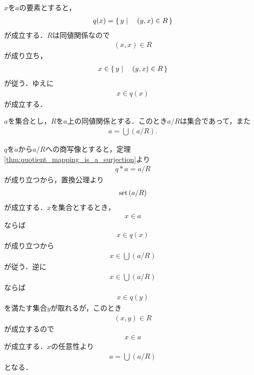 	\begin{sketch}
		$x$を$a$の要素とすると，
		\begin{align}
			q(x) = \left\{\, y \mid \quad (y,x) \in R\, \right\}
		\end{align}
		が成立する．$R$は同値関係なので
		\begin{align}
			(x,x) \in R
		\end{align}
		が成り立ち，
		\begin{align}
			x \in \left\{\, y \mid \quad (y,x) \in R\, \right\}
		\end{align}
		が従う．ゆえに
		\begin{align}
			x \in q(x)
		\end{align}
		が成立する．
		\QED
	\end{sketch}
	
	\begin{screen}
		\begin{thm}[商集合の合併は割る前の集合に一致する]
			$a$を集合とし，$R$を$a$上の同値関係とする．このとき$a/R$は集合であって，また
			\begin{align}
				a = \bigcup (a/R).
			\end{align}
		\end{thm}
	\end{screen}
	
	\begin{prf}
		$q$を$a$から$a/R$への商写像とすると，定理\ref{thm:quotient_mapping_is_a_surjection}より
		\begin{align}
			q \ast a = a/R
		\end{align}
		が成り立つから，置換公理より
		\begin{align}
			\operatorname*{set} \left(a/R\right)
		\end{align}
		が成立する．$x$を集合とするとき，
		\begin{align}
			x \in a
		\end{align}
		ならば
		\begin{align}
			x \in q(x)
		\end{align}
		が成り立つから
		\begin{align}
			x \in \bigcup (a/R)
		\end{align}
		が従う．逆に
		\begin{align}
			x \in \bigcup (a/R)
		\end{align}
		ならば
		\begin{align}
			x \in q(y)
		\end{align}
		を満たす集合$y$が取れるが，このとき
		\begin{align}
			(x,y) \in R
		\end{align}
		が成立するので
		\begin{align}
			x \in a
		\end{align}
		が成立する．$x$の任意性より
		\begin{align}
			a = \bigcup (a/R)
		\end{align}
		となる．
		\QED
	\end{prf}
	
